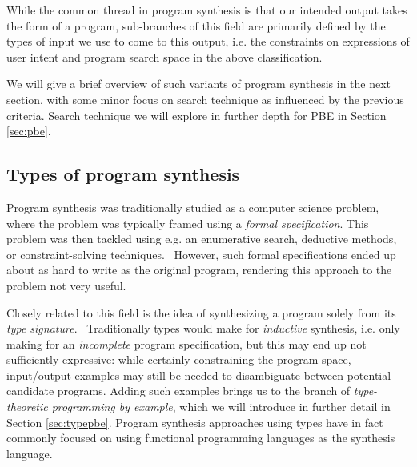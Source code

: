 \documentclass{article}
\begin{document}
While the common thread in program synthesis is that our intended output takes the form of a program,
sub-branches of this field are primarily defined by the types of input we use to come to this output,
i.e. the constraints on expressions of user intent and program search space in the above classification.

We will give a brief overview of such variants of program synthesis in the next section,
with some minor focus on search technique as influenced by the previous criteria.
Search technique we will explore in further depth for PBE in Section \ref{sec:pbe}.

\subsection{Types of program synthesis} \label{sec:synthtypes}


Program synthesis was traditionally studied as a computer science problem,
where the problem was typically framed using a \emph{formal specification}.
This problem was then tackled using e.g. an enumerative search, deductive methods, or constraint-solving techniques.~\citep{gulwani2017program}
However, such formal specifications ended up about as hard to write as the original program,
rendering this approach to the problem not very useful.

Closely related to this field is the idea of synthesizing a program solely from its \emph{type signature}.~\citep{djinn,synquid}
Traditionally types would make for \emph{inductive} synthesis,
i.e. only making for an \emph{incomplete} program specification,
but this may end up not sufficiently expressive:
while certainly constraining the program space,
input/output examples may still be needed to disambiguate between potential candidate programs.
Adding such examples brings us to the branch of \emph{type-theoretic programming by example},
which we will introduce in further detail in Section \ref{sec:typepbe}.
Program synthesis approaches using types have in fact commonly focused on using functional programming languages as the synthesis language.%
~\citep{synquid,eguchi2018automated,scythe,scout,gissurarson2018suggesting,idris,lenses}
\end{document}
